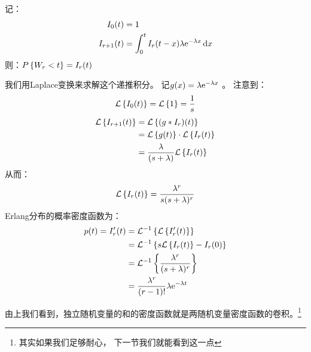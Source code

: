 记：
\begin{align*}
    I_{0}(t) &= 1\\
    I_{r+1}(t) &= \int_{0}^{t} I_{r}(t-x) \lambda \e^{-\lambda x} \d{x}
    \end{align*}
则：\(\P{W_{r}<t} = I_{r}(t)\)

我们用Laplace变换来求解这个递推积分。
记\(g(x) = \lambda \e^{-\lambda x} \) 。
注意到：
\[
    \L{I_{0}(t)} = \L{1} = \frac{1}{s} \\
\]
\begin{align*}
    \L{I_{r+1}(t)} &= \L{(g * I_{r})(t)} \\
    &= \L{g(t)} \cdot \L{I_{r}(t)} \\
    &= \frac{\lambda}{(s+\lambda)} \L{I_{r}(t)}\\
\end{align*}
从而：\[
    \L{I_{r}(t)} = \frac{\lambda^{r}}{s(s+\lambda)^{r}} \\
\]
Erlang分布的概率密度函数为：
\begin{align*}
    p(t) = I_{r}'(t) &= \invL{\L{I_{r}'(t)}} \\
    &= \invL{s\L{I_{r}(t)} - I_{r}(0)} \\
    &= \invL{\frac{\lambda^{r}}{(s+\lambda)^{r}}} \\
    &= \frac{\lambda^{r}}{(r-1)!} \lambda \e^{-\lambda t} \\
\end{align*}

由上我们看到，独立随机变量的和的密度函数就是两随机变量密度函数的卷积。\footnote{其实如果我们足够耐心，
下一节我们就能看到这一点}